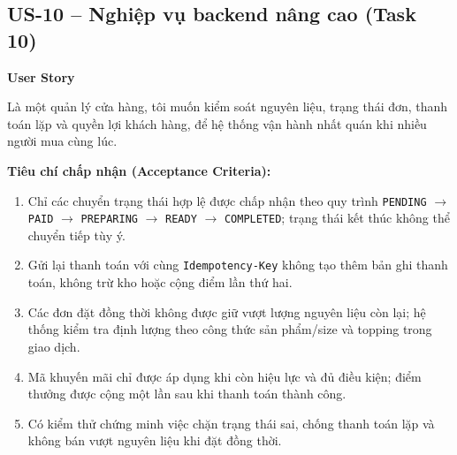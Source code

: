 \subsection{US-10 -- Nghiệp vụ backend nâng cao (Task 10)}
\textbf{User Story}\par
Là một quản lý cửa hàng, tôi muốn kiểm soát nguyên liệu, trạng thái đơn, thanh toán lặp và quyền lợi khách hàng, để hệ thống vận hành nhất quán khi nhiều người mua cùng lúc.

\textbf{Tiêu chí chấp nhận (Acceptance Criteria):}
\begin{enumerate}
  \item Chỉ các chuyển trạng thái hợp lệ được chấp nhận theo quy trình \texttt{PENDING} $\rightarrow$ \texttt{PAID} $\rightarrow$ \texttt{PREPARING} $\rightarrow$ \texttt{READY} $\rightarrow$ \texttt{COMPLETED}; trạng thái kết thúc không thể chuyển tiếp tùy ý.
  \item Gửi lại thanh toán với cùng \texttt{Idempotency-Key} không tạo thêm bản ghi thanh toán, không trừ kho hoặc cộng điểm lần thứ hai.
  \item Các đơn đặt đồng thời không được giữ vượt lượng nguyên liệu còn lại; hệ thống kiểm tra định lượng theo công thức sản phẩm/size và topping trong giao dịch.
  \item Mã khuyến mãi chỉ được áp dụng khi còn hiệu lực và đủ điều kiện; điểm thưởng được cộng một lần sau khi thanh toán thành công.
  \item Có kiểm thử chứng minh việc chặn trạng thái sai, chống thanh toán lặp và không bán vượt nguyên liệu khi đặt đồng thời.
\end{enumerate}
